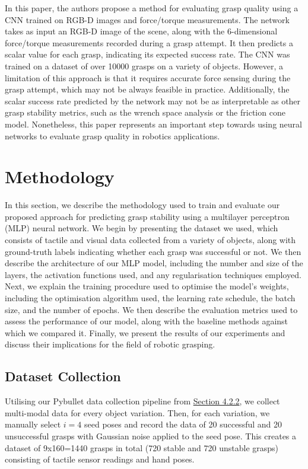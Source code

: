 \documentclass[11pt, a4paper]{report}
\begin{document}
In this paper, the authors propose a method for evaluating grasp quality using a CNN trained on RGB-D images and force/torque measurements. The network takes as input an RGB-D image of the scene, along with the 6-dimensional force/torque measurements recorded during a grasp attempt. It then predicts a scalar value for each grasp, indicating its expected success rate. The CNN was trained on a dataset of over 10000 grasps on a variety of objects. However, a limitation of this approach is that it requires accurate force sensing during the grasp attempt, which may not be always feasible in practice. Additionally, the scalar success rate predicted by the network may not be as interpretable as other grasp stability metrics, such as the wrench space analysis or the friction cone model. Nonetheless, this paper represents an important step towards using neural networks to evaluate grasp quality in robotics applications.


\newpage
\section{Methodology}\label{sec:5.2}
In this section, we describe the methodology used to train and evaluate our proposed approach for predicting grasp stability using a multilayer perceptron (MLP) neural network. We begin by presenting the dataset we used, which consists of tactile and visual data collected from a variety of objects, along with ground-truth labels indicating whether each grasp was successful or not. We then describe the architecture of our MLP model, including the number and size of the layers, the activation functions used, and any regularisation techniques employed. Next, we explain the training procedure used to optimise the model's weights, including the optimisation algorithm used, the learning rate schedule, the batch size, and the number of epochs. We then describe the evaluation metrics used to assess the performance of our model, along with the baseline methods against which we compared it. Finally, we present the results of our experiments and discuss their implications for the field of robotic grasping.


\subsection{Dataset Collection}\label{sec:5.2.1}
Utilising our Pybullet data collection pipeline from \hyperref[sec:4.2.2]{Section 4.2.2}, we collect multi-modal data for every object variation. Then, for each variation, we manually select $i=4$ seed poses and record the data of 20 successful and 20 unsuccessful grasps with Gaussian noise applied to the seed pose. This creates a dataset of 9x160=1440 grasps in total (720 stable and 720 unstable grasps) consisting of tactile sensor readings and hand poses.
\end{document}

